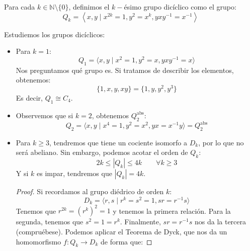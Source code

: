 \begin{definicion}
    Para cada $k\in \mathbb{N}\setminus \{0\}$, definimos el $k-$ésimo grupo dicíclico como el grupo:
    \begin{equation*}
        Q_k = \left\langle x,y \mid x^{2k} = 1, y^2 = x^k, yxy^{-1} = x^{-1}  \right\rangle 
    \end{equation*}
\end{definicion}

\begin{ejemplo}
    Estudiemos los grupos dicíclicos:
    \begin{itemize}
        \item Para $k=1$:
            \begin{equation*}
                Q_1 = \langle x,y\mid x^2 = 1, y^2 = x, yxy^{-1} = x \rangle 
            \end{equation*}
            Nos preguntamos qué grupo es. Si tratamos de describir los elementos, obtenemos:
            \begin{equation*}
                \{1,x,y,xy\} = \{1,y,y^2,y^3\}
            \end{equation*}
            Es decir, $Q_1\cong C_4$.
        \item Observemos que si $k=2$, obtenemos $Q_2^\text{abs}$:
            \begin{equation*}
                Q_2 = \langle x,y \mid x^4 = 1, y^2 = x^2, yx = x^{-1}y \rangle  = Q_2^{\text{abs}}
            \end{equation*}
        \item Para $k\geq 3$, tendremos que tiene un cociente isomorfo a $D_k$, por lo que no será abeliano. Sin embargo, podemos acotar el orden de $Q_k$:
            \begin{equation*}
                2k \leq |Q_k| \leq 4k \qquad \forall k\geq 3
            \end{equation*}
            Y si $k$ es impar, tendremos que $|Q_k| = 4k$.
            \begin{proof}
                Si recordamos al grupo diédrico de orden $k$:
                \begin{equation*}
                    D_k = \langle r,s \mid r^k = s^2 = 1, sr = r^{-1}s \rangle 
                \end{equation*}
                Tenemos que $r^{2k} = {(r^{k})}^{2} = 1$ y tenemos la primera relación. Para la segunda, tenemos que $s^2 = 1 = r^k$. Finalmente, $sr = r^{-1}s$ nos da la tercera (compruébese). Podemos aplicar el Teorema de Dyck, que nos da un homomorfismo $f:Q_k\to D_k$ de forma que: %

\end{proof}
\end{itemize}
\end{ejemplo}

